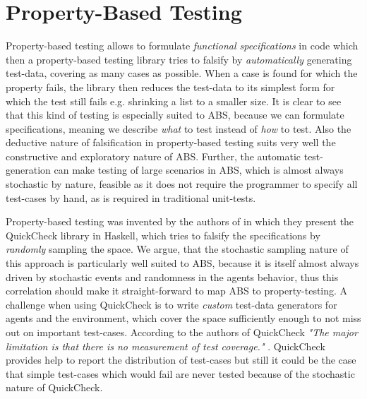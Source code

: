 \section{Property-Based Testing}
\label{sec:proptesting}

Property-based testing allows to formulate \textit{functional specifications} in code which then a property-based testing library tries to falsify by \textit{automatically} generating test-data, covering as many cases as possible. When a case is found for which the property fails, the library then reduces the test-data to its simplest form for which the test still fails e.g. shrinking a list to a smaller size. It is clear to see that this kind of testing is especially suited to ABS, because we can formulate specifications, meaning we describe \textit{what} to test instead of \textit{how} to test. Also the deductive nature of falsification in property-based testing suits very well the constructive and exploratory nature of ABS. Further, the automatic test-generation can make testing of large scenarios in ABS, which is almost always stochastic by nature, feasible as it does not require the programmer to specify all test-cases by hand, as is required in traditional unit-tests.

Property-based testing was invented by the authors of \cite{claessen_quickcheck_2000,claessen_testing_2002} in which they present the QuickCheck library in Haskell, which tries to falsify the specifications by \textit{randomly} sampling the space. We argue, that the stochastic sampling nature of this approach is particularly well suited to ABS, because it is itself almost always driven by stochastic events and randomness in the agents behavior, thus this correlation should make it straight-forward to map ABS to property-testing. A challenge when using QuickCheck is to write \textit{custom} test-data generators for agents and the environment, which cover the space sufficiently enough to not miss out on important test-cases. According to the authors of QuickCheck \textit{"The major limitation is that there is no measurement of test coverage."} \cite{claessen_quickcheck_2000}. QuickCheck provides help to report the distribution of test-cases but still it could be the case that simple test-cases which would fail are never tested because of the stochastic nature of QuickCheck.

